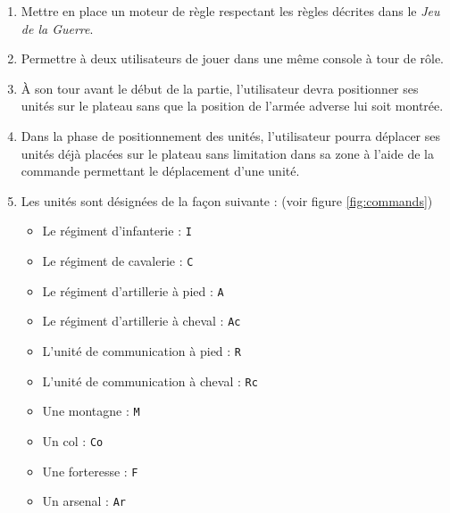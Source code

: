 \documentclass[a4paper]{report}
\begin{document}
\begin{enumerate}
\item Mettre en place un moteur de règle respectant les règles décrites dans le \textit{Jeu de la Guerre}.

\item Permettre à deux utilisateurs de jouer dans une même console à tour de rôle.

\item À son tour avant le début de la partie, l'utilisateur devra positionner ses unités sur le plateau sans que la position de l'armée adverse lui soit montrée.

\item Dans la phase de positionnement des unités, l'utilisateur pourra déplacer ses unités déjà placées sur le plateau sans limitation dans sa zone à l'aide de la commande permettant le déplacement d'une unité.

\item Les unités sont désignées de la façon suivante : (voir figure \ref{fig:commands})
	\begin{itemize}
	\item Le régiment d'infanterie : \texttt{I}
    \item Le régiment de cavalerie : \texttt{C}
    \item Le régiment d'artillerie à pied : \texttt{A}
    \item Le régiment d'artillerie à cheval : \texttt{Ac}
    \item L'unité de communication à pied : \texttt{R}
    \item L'unité de communication à cheval : \texttt{Rc}
    \item Une montagne : \texttt{M}
    \item Un col : \texttt{Co}
    \item Une forteresse : \texttt{F}
    \item Un arsenal : \texttt{Ar}
	\end{itemize}


\end{enumerate}
\end{document}
